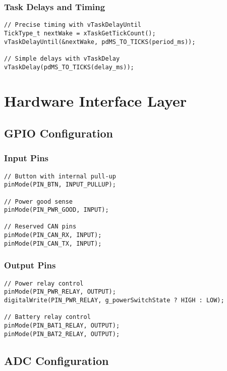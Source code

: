\documentclass[11pt,a4paper]{article}
\begin{document}
\subsubsection{Task Delays and Timing}
\begin{lstlisting}[caption=Task Delays and Timing]
// Precise timing with vTaskDelayUntil
TickType_t nextWake = xTaskGetTickCount();
vTaskDelayUntil(&nextWake, pdMS_TO_TICKS(period_ms));

// Simple delays with vTaskDelay
vTaskDelay(pdMS_TO_TICKS(delay_ms));
\end{lstlisting}

\section{Hardware Interface Layer}

\subsection{GPIO Configuration}

\subsubsection{Input Pins}
\begin{lstlisting}[caption=Input Pin Configuration]
// Button with internal pull-up
pinMode(PIN_BTN, INPUT_PULLUP);

// Power good sense
pinMode(PIN_PWR_GOOD, INPUT);

// Reserved CAN pins
pinMode(PIN_CAN_RX, INPUT);
pinMode(PIN_CAN_TX, INPUT);
\end{lstlisting}

\subsubsection{Output Pins}
\begin{lstlisting}[caption=Output Pin Configuration]
// Power relay control
pinMode(PIN_PWR_RELAY, OUTPUT);
digitalWrite(PIN_PWR_RELAY, g_powerSwitchState ? HIGH : LOW);

// Battery relay control
pinMode(PIN_BAT1_RELAY, OUTPUT);
pinMode(PIN_BAT2_RELAY, OUTPUT);
\end{lstlisting}

\subsection{ADC Configuration}
\end{document}
